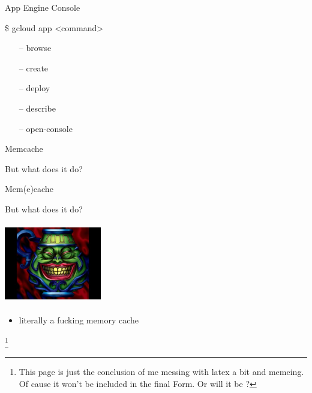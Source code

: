 \documentclass{beamer}
\begin{document}
\begin{frame}{App Engine Console}
	
	\$ gcloud app <command>\\
	
	\begin{enumerate}
		
		\item[--] browse 
		\item[--] create
		\item[--] deploy
		\item[--] describe 
		\item[--] open-console
	\end{enumerate}
\end{frame}
\begin{frame}{Memcache}
	\begin{block}{}
	But what does it do? 
	\end{block}
\end{frame}
\begin{frame}{Mem(e)cache}

\begin{block}

	But what does it do?
\end{block} \begin{center}
\includegraphics[width= 120pt, height=100pt]{potofgreed.jpg}
\end{center}

\begin{itemize}
\item literally a fucking  
	\colorbox{green!30}{memory cache}
\end{itemize}
\footnote{This page is just the conclusion of me messing with latex a bit and memeing. Of cause it won't be included in the final Form. Or will it be ?  }
\end{frame}
\end{document}
